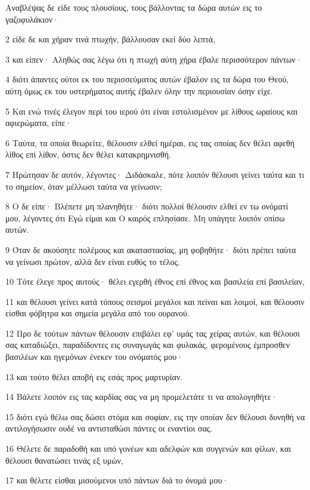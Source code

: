 \par Αναβλέψας δε είδε τους πλουσίους, τους βάλλοντας τα δώρα αυτών εις το γαζοφυλάκιον·
\par 2 είδε δε και χήραν τινά πτωχήν, βάλλουσαν εκεί δύο λεπτά,
\par 3 και είπεν· Αληθώς σας λέγω ότι η πτωχή αύτη χήρα έβαλε περισσότερον πάντων·
\par 4 διότι άπαντες ούτοι εκ του περισσεύματος αυτών έβαλον εις τα δώρα του Θεού, αύτη όμως εκ του υστερήματος αυτής έβαλεν όλην την περιουσίαν όσην είχε.
\par 5 Και ενώ τινές έλεγον περί του ιερού ότι είναι εστολισμένον με λίθους ωραίους και αφιερώματα, είπε·
\par 6 Ταύτα, τα οποία θεωρείτε, θέλουσιν ελθεί ημέραι, εις τας οποίας δεν θέλει αφεθή λίθος επί λίθον, όστις δεν θέλει κατακρημνισθή.
\par 7 Ηρώτησαν δε αυτόν, λέγοντες· Διδάσκαλε, πότε λοιπόν θέλουσι γείνει ταύτα και τι το σημείον, όταν μέλλωσι ταύτα να γείνωσιν;
\par 8 Ο δε είπε· Βλέπετε μη πλανηθήτε· διότι πολλοί θέλουσιν ελθεί εν τω ονόματί μου, λέγοντες ότι Εγώ είμαι και Ο καιρός επλησίασε. Μη υπάγητε λοιπόν οπίσω αυτών.
\par 9 Όταν δε ακούσητε πολέμους και ακαταστασίας, μη φοβηθήτε· διότι πρέπει ταύτα να γείνωσι πρώτον, αλλά δεν είναι ευθύς το τέλος.
\par 10 Τότε έλεγε προς αυτούς· θέλει εγερθή έθνος επί έθνος και βασιλεία επί βασιλείαν,
\par 11 και θέλουσι γείνει κατά τόπους σεισμοί μεγάλοι και πείναι και λοιμοί, και θέλουσιν είσθαι φόβητρα και σημεία μεγάλα από του ουρανού.
\par 12 Προ δε τούτων πάντων θέλουσιν επιβάλει εφ' υμάς τας χείρας αυτών, και θέλουσι σας καταδιώξει, παραδίδοντες εις συναγωγάς και φυλακάς, φερομένους έμπροσθεν βασιλέων και ηγεμόνων ένεκεν του ονόματός μου·
\par 13 και τούτο θέλει αποβή εις εσάς προς μαρτυρίαν.
\par 14 Βάλετε λοιπόν εις τας καρδίας σας να μη προμελετάτε τι να απολογηθήτε·
\par 15 διότι εγώ θέλω σας δώσει στόμα και σοφίαν, εις την οποίαν δεν θέλουσι δυνηθή να αντιλογήσωσιν ουδέ να αντισταθώσι πάντες οι εναντίοι σας.
\par 16 Θέλετε δε παραδοθή και υπό γονέων και αδελφών και συγγενών και φίλων, και θέλουσι θανατώσει τινάς εξ υμών,
\par 17 και θέλετε είσθαι μισούμενοι υπό πάντων διά το όνομά μου·
